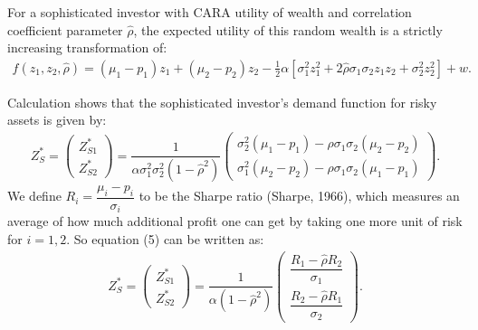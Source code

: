 \documentclass[10pt]{article}
\begin{document}
For a sophisticated investor with CARA utility of wealth and correlation coefficient parameter $ \hat \rho $, the expected utility of this random wealth is a strictly increasing transformation of:
\begin{eqnarray}
f (z_1, z_2, \hat{\rho}) = (\mu_1 - p_1) z_1 + (\mu_2 - p_2) z_2 - \frac12 \alpha \left[ \sigma_1^2 z_1^2 + 2 \hat{\rho} \sigma_1 \sigma_2 z_1 z_2 + \sigma_2^2 z_2^2 \right] + w.
\end{eqnarray}

Calculation shows that the sophisticated investor's demand function for risky assets is given by:
\begin{eqnarray}
Z_S^* = \left( \begin{matrix} Z_{S 1}^* \\ Z_{S 2}^* \end{matrix} \right) 
= \dfrac1{\alpha \sigma_1^2 \sigma_2^2 (1 - {\hat \rho}^2)} \left( \begin{matrix} \sigma_2^2 (\mu_1 - p_1) - {\hat \rho} \sigma_1 \sigma_2 (\mu_2 - p_2) \\ \sigma_1^2 (\mu_2 - p_2) - {\hat \rho} \sigma_1 \sigma_2 (\mu_1 - p_1) \end{matrix} \right).
\end{eqnarray}
We define $ R_i = \dfrac{\mu_i - p_i}{\sigma_i} $ to be the Sharpe ratio (Sharpe, 1966), which measures an average of how much additional profit one can get by taking one more unit of risk for $ i = 1, 2 $. So equation (5) can be written as:
\begin{eqnarray}
Z_S^* = \left( \begin{matrix} Z_{S 1}^* \\ Z_{S 2}^* \end{matrix} \right) = \dfrac1{\alpha (1 - {\hat \rho}^2)} \left( \begin{matrix} \dfrac{R_1 - {\hat \rho} R_2}{\sigma_1} \\ \dfrac{R_2 - {\hat \rho} R_1}{\sigma_2} \end{matrix} \right).
\end{eqnarray}
\end{document}
